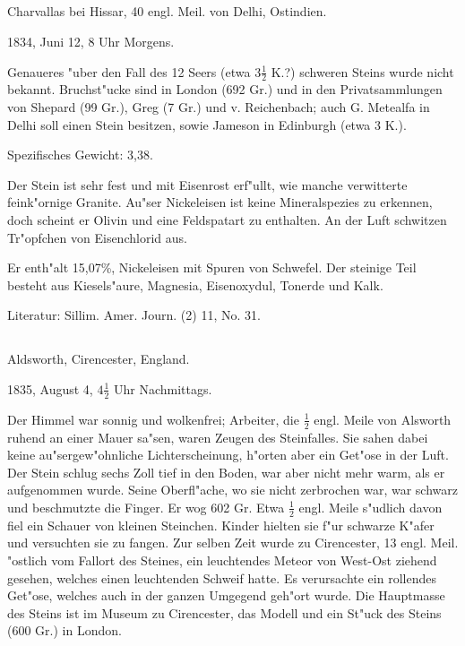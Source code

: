 \documentclass[a4paper, 11pt, oneside]{article}
\begin{document}
\subsection{}
\LARGE
\paragraph{}
Charvallas bei Hissar, 40 engl. Meil. von Delhi, Ostindien.

1834, Juni 12, 8 Uhr Morgens.

Genaueres "uber den Fall des 12 Seers (etwa $\mathfrak{3\frac{1}{2}}$ K.?) schweren Steins wurde nicht bekannt. Bruchst"ucke sind in London (692 Gr.) und in den Privatsammlungen von Shepard (99 Gr.), Greg (7 Gr.) und v. Reichenbach; auch G. Metealfa in Delhi soll einen Stein besitzen, sowie Jameson in Edinburgh (etwa 3 K.).

Spezifisches Gewicht: 3,38.

Der Stein ist sehr fest und mit Eisenrost erf"ullt, wie manche verwitterte feink"ornige Granite. Au"ser Nickeleisen ist keine Mineralspezies zu erkennen, doch scheint er Olivin und eine Feldspatart zu enthalten. An der Luft schwitzen Tr"opfchen von Eisenchlorid aus.

Er enth"alt 15,07\%, Nickeleisen mit Spuren von Schwefel. Der steinige Teil besteht aus Kiesels"aure, Magnesia, Eisenoxydul, Tonerde und Kalk.

\normalsize
Literatur: Sillim. Amer. Journ. (2) 11, No. 31.

\subsection{}
\LARGE
\paragraph{}
Aldsworth, Cirencester, England.

1835, August 4, $\mathfrak{4\frac{1}{2}}$ Uhr Nachmittags.

Der Himmel war sonnig und wolkenfrei; Arbeiter, die $\mathfrak{\frac{1}{2}}$ engl. Meile von Alsworth ruhend an einer Mauer sa"sen, waren Zeugen des Steinfalles. Sie sahen dabei keine au"sergew"ohnliche Lichterscheinung, h"orten aber ein Get"ose in der Luft. Der Stein schlug sechs Zoll tief in den Boden, war aber nicht mehr warm, als er aufgenommen wurde. Seine Oberfl"ache, wo sie nicht zerbrochen war, war schwarz und beschmutzte die Finger. Er wog 602 Gr. Etwa $\mathfrak{\frac{1}{2}}$ engl. Meile s"udlich davon fiel ein Schauer von kleinen Steinchen. Kinder hielten sie f"ur schwarze K"afer und versuchten sie zu fangen. Zur selben Zeit wurde zu Cirencester, 13 engl. Meil. "ostlich vom Fallort des Steines, ein leuchtendes Meteor von West-Ost ziehend gesehen, welches einen leuchtenden Schweif hatte. Es verursachte ein rollendes Get"ose, welches auch in der ganzen Umgegend geh"ort wurde. Die Hauptmasse des Steins ist im Museum zu Cirencester, das Modell und ein St"uck des Steins (600 Gr.) in London.
\end{document}
